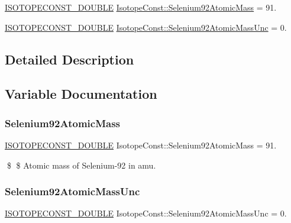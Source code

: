 \begin{DoxyCompactItemize}
\item 
\mbox{\hyperlink{group___isotope_const-_macros_ga8f45a7272ce02c0b4c65c44636ed719a}{I\+S\+O\+T\+O\+P\+E\+C\+O\+N\+S\+T\+\_\+\+D\+O\+U\+B\+LE}} \mbox{\hyperlink{group___isotope_const-_selenium-_se92_ga51fbafe70ee4856d1ee8e35bdd544b45}{Isotope\+Const\+::\+Selenium92\+Atomic\+Mass}} = 91.
\item 
\mbox{\hyperlink{group___isotope_const-_macros_ga8f45a7272ce02c0b4c65c44636ed719a}{I\+S\+O\+T\+O\+P\+E\+C\+O\+N\+S\+T\+\_\+\+D\+O\+U\+B\+LE}} \mbox{\hyperlink{group___isotope_const-_selenium-_se92_ga19dcbd878c332336038d8946114dd99e}{Isotope\+Const\+::\+Selenium92\+Atomic\+Mass\+Unc}} = 0.
\end{DoxyCompactItemize}


\subsection{Detailed Description}


\subsection{Variable Documentation}
\mbox{\label{group___isotope_const-_selenium-_se92_ga51fbafe70ee4856d1ee8e35bdd544b45}} 
\subsubsection{\texorpdfstring{Selenium92\+Atomic\+Mass}{Selenium92AtomicMass}}
{\footnotesize\ttfamily \mbox{\hyperlink{group___isotope_const-_macros_ga8f45a7272ce02c0b4c65c44636ed719a}{I\+S\+O\+T\+O\+P\+E\+C\+O\+N\+S\+T\+\_\+\+D\+O\+U\+B\+LE}} Isotope\+Const\+::\+Selenium92\+Atomic\+Mass = 91.}

\$ \$ Atomic mass of Selenium-\/92 in amu. \mbox{\label{group___isotope_const-_selenium-_se92_ga19dcbd878c332336038d8946114dd99e}} 
\subsubsection{\texorpdfstring{Selenium92\+Atomic\+Mass\+Unc}{Selenium92AtomicMassUnc}}
{\footnotesize\ttfamily \mbox{\hyperlink{group___isotope_const-_macros_ga8f45a7272ce02c0b4c65c44636ed719a}{I\+S\+O\+T\+O\+P\+E\+C\+O\+N\+S\+T\+\_\+\+D\+O\+U\+B\+LE}} Isotope\+Const\+::\+Selenium92\+Atomic\+Mass\+Unc = 0.}

